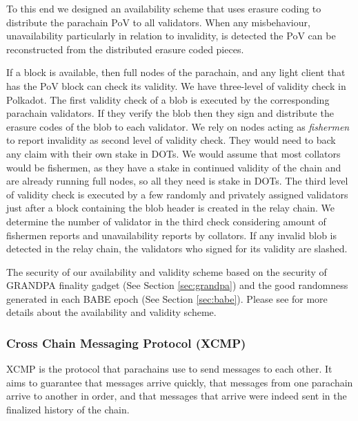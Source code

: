 To this end we designed an availability scheme that uses erasure coding  to distribute the parachain PoV to all validators.
When any misbehaviour, unavailability particularly in relation to invalidity, is detected the PoV can be reconstructed from the distributed erasure coded pieces.

If a block is available, then full nodes of the parachain, and any light client that has the PoV block can check its validity. We have three-level of validity check in Polkadot. The first validity check of a blob is executed by the corresponding parachain validators. If they verify the blob then they sign and distribute the erasure codes of the blob to each validator.
We rely on nodes acting as {\em fishermen} to report invalidity as second level of validity check. They would need to back any claim with their own stake in DOTs. We would assume that most collators would be fishermen, as they have a stake in continued validity of the chain and are already running full nodes, so all they need is stake in DOTs. The third level of validity check is executed by a few randomly and privately assigned validators just after a block containing the blob header is created in the relay chain. We determine the number of validator in the third check considering amount of fishermen reports and unavailability reports by collators. If  any invalid blob is detected in the relay chain, the validators who signed for its validity are slashed.

The security of our availability and validity scheme based on the security of GRANDPA finality gadget (See Section \ref{sec:grandpa}) and the good randomness generated in each BABE epoch (See Section \ref{sec:babe}). Please see \cite{availandvalid} for more details about the availability and validity scheme.


\subsubsection{Cross Chain Messaging Protocol (XCMP)} \label{sec:XCMP}
XCMP is the protocol that parachains use to send messages to each other. It aims to guarantee that messages arrive quickly, that messages from one parachain arrive to another in order,
and that messages that arrive were indeed sent in the finalized history of the chain.

